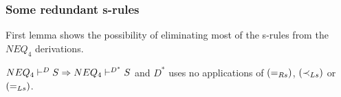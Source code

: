 \subsubsection{Some redundant s-rules}\label{sub:nosx}
First lemma shows the possibility of eliminating most of the s-rules from the $NEQ_4$
derivations.
\begin{LEMMA}\label{le:nosx}
${NEQ_4}\vdash^{{D}}S \mathrel\Rightarrow {NEQ_4}\vdash^{{D^*}}S$ and $D^*$ uses no applications
of $(=_{Rs})$, $(\mathbin{\prec}_{Ls})$ or $(=_{Ls})$.
\end{LEMMA}
